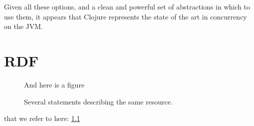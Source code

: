 \documentclass[a4paper,12pt]{kth-mag}
\begin{document}
Given all these options, and a clean and powerful set of abstractions in which to use them, it appears that Clojure represents the state of the art in concurrency on the JVM.

\appendix
\addappheadtotoc
\chapter{RDF}\label{appA}

\begin{figure}[ht]
\begin{center}
And here is a figure
\caption{\small{Several statements describing the same resource.}}\label{RDF_4}
\end{center}
\end{figure}

that we refer to here: \ref{RDF_4}
\end{document}
